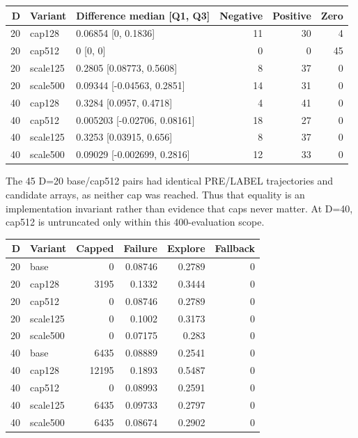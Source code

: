 \documentclass[11pt,a4paper]{article}
\begin{document}
\par\noindent\begin{minipage}{\linewidth}

\begin{longtable}[]{@{}rllrrr@{}}
\toprule
D & Variant & Difference median {[}Q1, Q3{]} & Negative & Positive &
Zero \\
\midrule
\endhead
20 & cap128 & 0.06854 {[}0, 0.1836{]} & 11 & 30 & 4 \\
20 & cap512 & 0 {[}0, 0{]} & 0 & 0 & 45 \\
20 & scale125 & 0.2805 {[}0.08773, 0.5608{]} & 8 & 37 & 0 \\
20 & scale500 & 0.09344 {[}-0.04563, 0.2851{]} & 14 & 31 & 0 \\
40 & cap128 & 0.3284 {[}0.0957, 0.4718{]} & 4 & 41 & 0 \\
40 & cap512 & 0.005203 {[}-0.02706, 0.08161{]} & 18 & 27 & 0 \\
40 & scale125 & 0.3253 {[}0.03915, 0.656{]} & 8 & 37 & 0 \\
40 & scale500 & 0.09029 {[}-0.002699, 0.2816{]} & 12 & 33 & 0 \\
\bottomrule
\end{longtable}

\end{minipage}\par

The 45 D=20 base/cap512 pairs had identical PRE/LABEL trajectories and
candidate arrays, as neither cap was reached. Thus that equality is an
implementation invariant rather than evidence that caps never matter. At
D=40, cap512 is untruncated only within this 400-evaluation scope.

\par\noindent\begin{minipage}{\linewidth}

\begin{longtable}[]{@{}rlrrrr@{}}
\toprule
D & Variant & Capped & Failure & Explore & Fallback \\
\midrule
\endhead
20 & base & 0 & 0.08746 & 0.2789 & 0 \\
20 & cap128 & 3195 & 0.1332 & 0.3444 & 0 \\
20 & cap512 & 0 & 0.08746 & 0.2789 & 0 \\
20 & scale125 & 0 & 0.1002 & 0.3173 & 0 \\
20 & scale500 & 0 & 0.07175 & 0.283 & 0 \\
40 & base & 6435 & 0.08889 & 0.2541 & 0 \\
40 & cap128 & 12195 & 0.1893 & 0.5487 & 0 \\
40 & cap512 & 0 & 0.08993 & 0.2591 & 0 \\
40 & scale125 & 6435 & 0.09733 & 0.2797 & 0 \\
40 & scale500 & 6435 & 0.08674 & 0.2902 & 0 \\
\bottomrule
\end{longtable}

\end{minipage}\par
\end{document}
